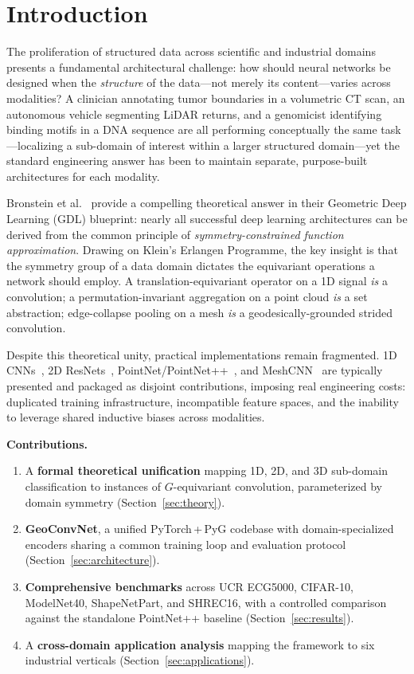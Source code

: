 \documentclass[10pt,conference]{IEEEtran}
\begin{document}
\section{Introduction}
\label{sec:intro}

The proliferation of structured data across scientific and industrial
domains presents a fundamental architectural challenge: how should neural
networks be designed when the \emph{structure} of the data---not merely
its content---varies across modalities? A clinician annotating tumor
boundaries in a volumetric CT scan, an autonomous vehicle segmenting
LiDAR returns, and a genomicist identifying binding motifs in a DNA
sequence are all performing conceptually the same task---localizing a
sub-domain of interest within a larger structured domain---yet the
standard engineering answer has been to maintain separate, purpose-built
architectures for each modality.

Bronstein et al.~\cite{bronstein2021geometric} provide a compelling
theoretical answer in their Geometric Deep Learning (GDL) blueprint:
nearly all successful deep learning architectures can be derived from the
common principle of \emph{symmetry-constrained function approximation}.
Drawing on Klein's Erlangen Programme, the key insight is that the
symmetry group of a data domain dictates the equivariant operations a
network should employ. A translation-equivariant operator on a 1D signal
\emph{is} a convolution; a permutation-invariant aggregation on a point
cloud \emph{is} a set abstraction; edge-collapse pooling on a mesh
\emph{is} a geodesically-grounded strided convolution.

Despite this theoretical unity, practical implementations remain
fragmented. 1D CNNs~\cite{lecun1998gradient}, 2D
ResNets~\cite{he2016deep},
PointNet/PointNet++~\cite{qi2017pointnet,qi2017pointnetplusplus}, and
MeshCNN~\cite{hanocka2019meshcnn} are typically presented and packaged as
disjoint contributions, imposing real engineering costs: duplicated
training infrastructure, incompatible feature spaces, and the inability
to leverage shared inductive biases across modalities.

\smallskip
\noindent\textbf{Contributions.}
\begin{enumerate}
  \item A \textbf{formal theoretical unification} mapping 1D, 2D, and 3D
    sub-domain classification to instances of $G$-equivariant convolution,
    parameterized by domain symmetry (Section~\ref{sec:theory}).
  \item \textbf{GeoConvNet}, a unified PyTorch\,+\,PyG codebase with
    domain-specialized encoders sharing a common training loop and
    evaluation protocol (Section~\ref{sec:architecture}).
  \item \textbf{Comprehensive benchmarks} across UCR ECG5000, CIFAR-10,
    ModelNet40, ShapeNetPart, and SHREC16, with a controlled comparison
    against the standalone PointNet++ baseline (Section~\ref{sec:results}).
  \item A \textbf{cross-domain application analysis} mapping the framework
    to six industrial verticals (Section~\ref{sec:applications}).
\end{enumerate}
\end{document}
